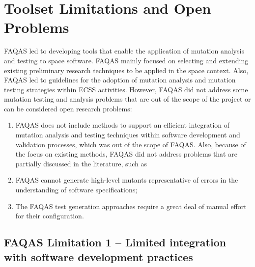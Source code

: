 
\chapter{Toolset Limitations and Open Problems}
\label{sec:limitations}

FAQAS led to developing tools that enable the application of mutation analysis and testing to space software. FAQAS mainly focused on selecting and extending existing preliminary research techniques to be applied in the space context. Also, FAQAS led to guidelines for the adoption of mutation analysis and mutation testing strategies within ECSS activities. However, FAQAS did not address some mutation testing and analysis problems that are out of the scope of the project or can be considered open research problems: 
\begin{enumerate}
\item FAQAS does not include methods to support an efficient integration of mutation analysis and testing techniques within software development and validation processes, which was out of the scope of FAQAS. Also, because of the focus on existing methods, FAQAS did not address problems that are partially discussed in the literature, such as 
\item FAQAS cannot generate high-level mutants representative of errors in the understanding of software specifications;
\item The FAQAS test generation approaches require a great deal of manual effort for their configuration.
\end{enumerate}

\section*{FAQAS Limitation 1 – Limited integration with software development practices}

